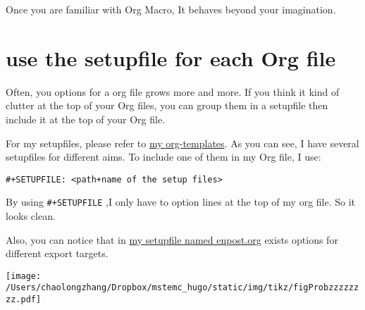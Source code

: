 \documentclass[koma,a4paper,utopia,12pt,listings-color,microtype,paralist,colorlinks,urlcolor=red]{org-article}
\begin{document}
Once you are familiar with Org Macro, It behaves beyond your imagination.
\section{use the setupfile for each Org file}
\label{sec:org956dd85}


Often, you options for a org file grows more and more. If you think it kind of
clutter at the top of your Org files, you can group them in a setupfile then
include it at the top of your Org file.

For my setupfiles, please refer to \href{https://github.com/msteamc/.spacemacs.d/tree/master/org-templates}{my org-templates}. As you can see, I have
several setupfiles for different aims. To include one of them in my Org file, I
use:

\texttt{\#+SETUPFILE: <path+name of the setup files>}

By using \texttt{\#+SETUPFILE} ,I only have to option lines at the top of my org file.
So it looks clean.

Also, you can notice that in \href{https://github.com/msteamc/.spacemacs.d/blob/master/org-templates/enpost.org}{my setupfile named enpost.org} exists options for
different export targets.


\begin{center}
\texttt{[image: /Users/chaolongzhang/Dropbox/mstemc\_hugo/static/img/tikz/figProbzzzzzzzz.pdf]}
\end{center}
\end{document}
